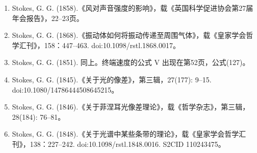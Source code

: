\begin{enumerate}
\item Stokes, G. G. (1858).《风对声音强度的影响》，载《英国科学促进协会第27届年会报告》，22–23页。
\item Stokes, G. G. (1868).《振动体如何将振动传递至周围气体》，载《皇家学会哲学汇刊》，158：447–463. doi:10.1098/rstl.1868.0017。
\item Stokes, G. G. (1851). 同上。终端速度的公式 V 出现在第52页，公式(127)。
\item Stokes, G. G. (1845).《关于光的像差》，第三辑，27(177): 9–15. doi:10.1080/14786444508645215。
\item Stokes, G. G. (1846).《关于菲涅耳光像差理论》，载《哲学杂志》，第三辑，28(184): 76–81。
\item Stokes, G. G. (1848).《关于光谱中某些条带的理论》，载《皇家学会哲学汇刊》，138：227–242. doi:10.1098/rstl.1848.0016. S2CID 110243475。


\end{enumerate}
